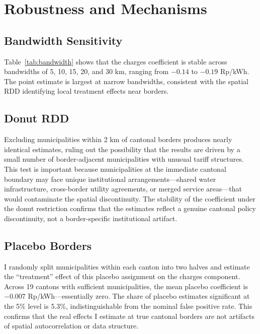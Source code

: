 \documentclass[12pt]{article}
\begin{document}



\section{Robustness and Mechanisms}

\subsection{Bandwidth Sensitivity}

Table~\ref{tab:bandwidth} shows that the charges coefficient is stable across bandwidths of 5, 10, 15, 20, and 30 km, ranging from $-0.14$ to $-0.19$ Rp/kWh. The point estimate is largest at narrow bandwidths, consistent with the spatial RDD identifying local treatment effects near borders.



\subsection{Donut RDD}

Excluding municipalities within 2 km of cantonal borders produces nearly identical estimates, ruling out the possibility that the results are driven by a small number of border-adjacent municipalities with unusual tariff structures. This test is important because municipalities at the immediate cantonal boundary may face unique institutional arrangements---shared water infrastructure, cross-border utility agreements, or merged service areas---that would contaminate the spatial discontinuity. The stability of the coefficient under the donut restriction confirms that the estimates reflect a genuine cantonal policy discontinuity, not a border-specific institutional artifact.

\subsection{Placebo Borders}

I randomly split municipalities within each canton into two halves and estimate the ``treatment'' effect of this placebo assignment on the charges component. Across 19 cantons with sufficient municipalities, the mean placebo coefficient is $-0.007$ Rp/kWh---essentially zero. The share of placebo estimates significant at the 5\% level is 5.3\%, indistinguishable from the nominal false positive rate. This confirms that the real effects I estimate at true cantonal borders are not artifacts of spatial autocorrelation or data structure.
\end{document}
